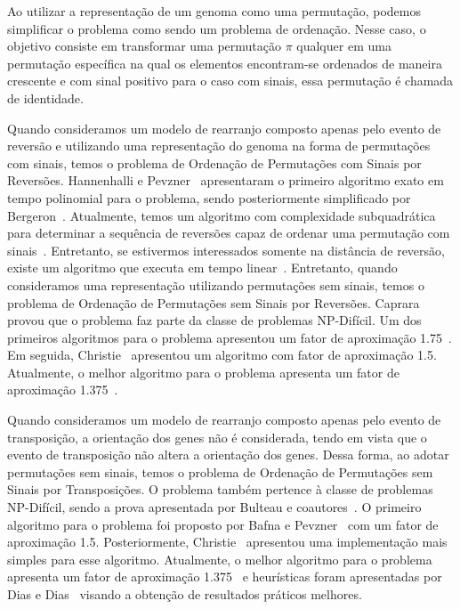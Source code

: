 Ao utilizar a representação de um genoma como uma permutação, podemos simplificar o problema como sendo um problema de ordenação. Nesse caso, o objetivo consiste em transformar uma permutação $\pi$ qualquer em uma permutação específica na qual os elementos encontram-se ordenados de maneira crescente e com sinal positivo para o caso com sinais, essa permutação é chamada de identidade.

Quando consideramos um modelo de rearranjo composto apenas pelo evento de reversão e utilizando uma representação do genoma na forma de permutações com sinais, temos o problema de Ordenação de Permutações com Sinais por Reversões. Hannenhalli e Pevzner~\cite{1999-hannenhalli-pevzner} apresentaram o primeiro algoritmo exato em tempo polinomial para o problema, sendo posteriormente simplificado por Bergeron~\cite{2005-bergeron}. Atualmente, temos um algoritmo com complexidade subquadrática para determinar a sequência de reversões capaz de ordenar uma permutação com sinais~\cite{2007-tannier-etal}. Entretanto, se estivermos interessados somente na distância de reversão, existe um algoritmo que executa em tempo linear~\cite{2001-bader-etal}. Entretanto, quando consideramos uma representação utilizando permutações sem sinais, temos o problema de Ordenação de Permutações sem Sinais por Reversões. Caprara~\cite{1999-caprara} provou que o problema faz parte da classe de problemas NP-Difícil. Um dos primeiros algoritmos para o problema apresentou um fator de aproximação 1.75~\cite{1996-bafna-pevzner}. Em seguida, Christie~\cite{1998a-christie} apresentou um algoritmo com fator de aproximação 1.5. Atualmente, o melhor algoritmo para o problema apresenta um fator de aproximação 1.375~\cite{2002-berman-etal}.

Quando consideramos um modelo de rearranjo composto apenas pelo evento de transposição, a orientação dos genes não é considerada, tendo em vista que o evento de transposição não altera a orientação dos genes. Dessa forma, ao adotar permutações sem sinais, temos o problema de Ordenação de Permutações sem Sinais por Transposições. O problema também pertence à classe de problemas NP-Difícil, sendo a prova apresentada por Bulteau e coautores~\cite{2012-bulteau-etal}. O primeiro algoritmo para o problema foi proposto por Bafna e Pevzner~\cite{1998-bafna-pevzner} com um fator de aproximação 1.5. Posteriormente, Christie~\cite{1998b-christie} apresentou uma implementação mais simples para esse algoritmo. Atualmente, o melhor algoritmo para o problema apresenta um fator de aproximação 1.375~\cite{2006-elias-hartman} e heurísticas foram apresentadas por Dias e Dias~\cite{2010c-dias-dias} visando a obtenção de resultados práticos melhores.

